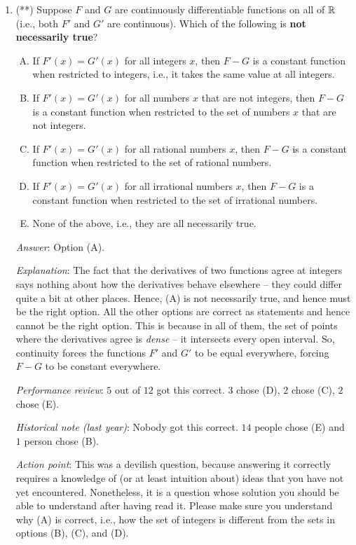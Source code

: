 \documentclass[10pt]{amsart}
\begin{document}
\begin{enumerate}
  {\em Action point}: Please make sure you understand very clearly the
  relation between the ``finer'' partition notion, norms of
  partitions, upper sums, and lower sums, to the point where you
  wondered how you could have ever got this question wrong.
\item (**) Suppose $F$ and $G$ are continuously differentiable
  functions on all of $\mathbb{R}$ (i.e., both $F'$ and $G'$ are
  continuous). Which of the following is {\bf not necessarily true}?

  \begin{enumerate}[(A)]
  \item If $F'(x) = G'(x)$ for all integers $x$, then $F - G$ is a
    constant function when restricted to integers, i.e., it takes the
    same value at all integers.
  \item If $F'(x) = G'(x)$ for all numbers $x$ that are not integers,
    then $F - G$ is a constant function when restricted to the set of
    numbers $x$ that are not integers.
  \item If $F'(x) = G'(x)$ for all rational numbers $x$, then $F - G$
    is a constant function when restricted to the set of rational
    numbers.
  \item If $F'(x) = G'(x)$ for all irrational numbers $x$, then $F -
    G$ is a constant function when restricted to the set of irrational
    numbers.
  \item None of the above, i.e., they are all necessarily true.
  \end{enumerate}

  {\em Answer}: Option (A).

  {\em Explanation}: The fact that the derivatives of two functions
  agree at integers says nothing about how the derivatives behave
  elsewhere -- they could differ quite a bit at other places. Hence,
  (A) is not necessarily true, and hence must be the right option. All
  the other options are correct as statements and hence cannot be the
  right option. This is because in all of them, the set of points
  where the derivatives agree is {\em dense} -- it intersects every
  open interval. So, continuity forces the functions $F'$ and $G'$ to
  be equal everywhere, forcing $F - G$ to be constant everywhere.

  {\em Performance review}: $5$ out of $12$ got this correct. $3$
  chose (D), $2$ chose (C), $2$ chose (E).

  {\em Historical note (last year)}: Nobody got this correct. $14$ people
  chose (E) and $1$ person chose (B).

  {\em Action point}: This was a devilish question, because answering
  it correctly requires a knowledge of (or at least intuition about)
  ideas that you have not yet encountered. Nonetheless, it is a
  question whose solution you should be able to understand after
  having read it. Please make sure you understand why (A) is correct,
  i.e., how the set of integers is different from the sets in options
  (B), (C), and (D).
\end{enumerate}
\end{document}
